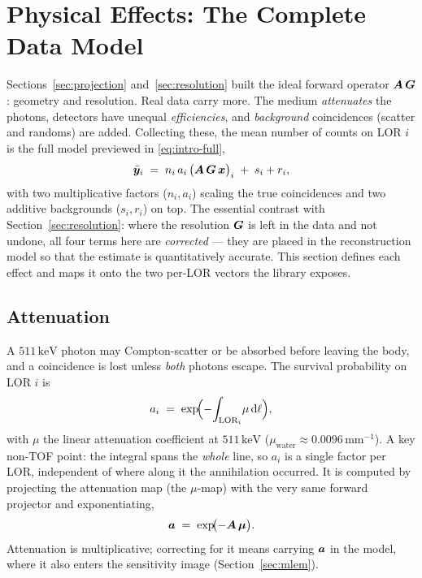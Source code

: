 \section{Physical Effects: The Complete Data Model}
\label{sec:datamodel}

Sections~\ref{sec:projection} and~\ref{sec:resolution} built the ideal forward
operator $\bm{A}\,\bm{G}$: geometry and resolution. Real data carry more. The medium
\emph{attenuates} the photons, detectors have unequal \emph{efficiencies}, and
\emph{background} coincidences (scatter and randoms) are added. Collecting these,
the mean number of counts on LOR $i$ is the full model previewed in
\eqref{eq:intro-full},
\begin{equation}
  \bar{\bm{y}}_i \;=\; n_i\,a_i\,\bigl(\bm{A}\,\bm{G}\,\bm{x}\bigr)_i \;+\; s_i + r_i ,
  \label{eq:dm-full}
\end{equation}
with two multiplicative factors ($n_i,a_i$) scaling the true coincidences and two
additive backgrounds ($s_i,r_i$) on top. The essential contrast with
Section~\ref{sec:resolution}: where the resolution $\bm{G}$ is left in the data and
not undone, all four terms here are \emph{corrected} --- they are placed in the
reconstruction model so that the estimate is quantitatively accurate. This
section defines each effect and maps it onto the two per-LOR vectors the library
exposes.

\subsection{Attenuation}
\label{sec:datamodel:attenuation}

A $511\,\mathrm{keV}$ photon may Compton-scatter or be absorbed before leaving
the body, and a coincidence is lost unless \emph{both} photons escape. The
survival probability on LOR $i$ is
\begin{equation}
  a_i \;=\; \exp\!\Bigl(-\!\int_{\mathrm{LOR}_i}\!\mu\,\mathrm{d}\ell\Bigr),
  \label{eq:dm-atten}
\end{equation}
with $\mu$ the linear attenuation coefficient at $511\,\mathrm{keV}$
($\mu_{\mathrm{water}}\approx0.0096\,\mathrm{mm}^{-1}$). A key non-TOF point: the
integral spans the \emph{whole} line, so $a_i$ is a single factor per LOR,
independent of where along it the annihilation occurred. It is computed by
projecting the attenuation map (the $\mu$-map) with the very same forward
projector and exponentiating,
\begin{equation}
  \bm{a} \;=\; \exp\!\bigl(-\bm{A}\,\bm{\mu}\bigr).
  \label{eq:dm-atten-proj}
\end{equation}
Attenuation is multiplicative; correcting for it means carrying $\bm{a}$ in the
model, where it also enters the sensitivity image (Section~\ref{sec:mlem}).

